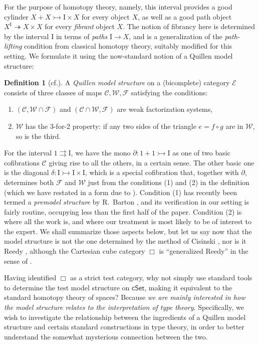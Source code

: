 \documentclass[11pt,reqno]{amsart}
\newcommand{\CC}{\ensuremath{\mathcal{C}}}
\newcommand{\WW}{\ensuremath{\mathcal{W}}}
\newcommand{\FF}{\ensuremath{\mathcal{F}}}
\newcommand{\EE}{\ensuremath{\mathcal{E}}}
\newcommand{\cSet}{\ensuremath{\mathsf{cSet}}}
\newcommand{\cof}{\ensuremath{\rightarrowtail}}
\newcommand{\fib}{\ensuremath{\twoheadrightarrow}}
\renewcommand{\to}{\ensuremath{\rightarrow}}
\newcommand{\I}{\ensuremath{\mathrm{I}}}
\newcommand{\del}{\ensuremath{\partial}}
\theoremstyle{remark}
\theoremstyle{definition}
\newtheorem{definition}[theorem]{Definition}
\begin{document}
For the purpose of homotopy theory, namely, this interval provides a good cylinder $X + X \cof \I\times X$ for every object $X$, as well as a good path object $X^\I \fib X\times X$ for every \emph{fibrant} object $X$.  The notion of fibrancy here is determined by the interval $\I$ in terms of \emph{paths} $\I\to X$, and is a generalization of the \emph{path-lifting} condition from classical homotopy theory, suitably modified for this setting. We formulate it using the now-standard notion of a Quillen model structure:

\begin{definition}[cf.\cite{Quillen:1967ha}]\label{def:qmsviaJT}
A \emph{Quillen model structure} on a (bicomplete) category $\EE$ consists of three classes of maps $\CC, \WW, \FF$ satisfying the conditions:\begin{enumerate}
\item $(\CC, \WW\cap\FF)$ and $(\CC\cap\WW, \FF)$ are weak factorization systems,
\item $\WW$ has the 3-for-2 property: if any two sides of the triangle $e = f\circ g$ are in $\WW$, so is the third.
\end{enumerate}
\end{definition}

For the interval $1\rightrightarrows \I$, we have the mono $\del:1+1\cof \I$ as one of two basic cofibrations $\CC$ giving rise to all the others, in a certain sense.  The other basic one is the diagonal $\delta : \I\cof\I\times\I$, which is a special cofibration that, together with $\del$, determines both $\FF$ and $\WW$ just from the conditions (1) and (2) in the definition (which we have restated in a form due to \cite{JT:intro}).  Condition (1) has recently been termed a \emph{premodel structure} by R.\ Barton \cite{Barton}, and its verification in our setting is fairly routine, occupying less than the first half of the paper.   Condition (2) is where all the work is, and where our treatment is most likely to be of interest to the expert. We shall summarize those aspects below, but let us say now that the model structure is not the one determined by the method of Cisinski \cite{cisinski-asterisque}, nor is it Reedy \cite{Reedy:1974ht}, although the Cartesian cube category $\Box$ is ``generalized Reedy'' in the sense of \cite{BergerMoerdijk:2008rc}.  

Having identified $\Box$ as a strict test category, why not simply use standard tools to determine the test model structure on $\cSet$, making it equivalent to the standard homotopy theory of spaces?  Because \emph{we are mainly interested in how the model structure relates to the interpretation of type theory}.  
Specifically, we wish to investigate the relationship between the ingredients of a Quillen model structure and certain standard constructions in type theory, in order to better understand the somewhat mysterious connection between the two.
\end{document}
